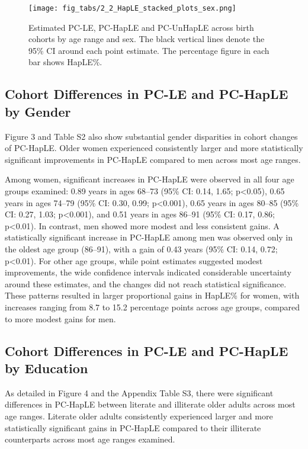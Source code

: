 \documentclass[12pt, a4paper]{article}
\begin{document}
\begin{figure}[!p]
  \centering
  \texttt{[image: fig\_tabs/2\_2\_HapLE\_stacked\_plots\_sex.png]}
  \caption{Estimated PC-LE, PC-HapLE and PC-UnHapLE across birth cohorts by age range and sex. The black vertical lines denote the 95\% CI around each point estimate. The percentage figure in each bar shows HapLE\%.}
\end{figure}

\subsection{Cohort Differences in PC-LE and PC-HapLE by Gender}

Figure 3 and Table S2 also show substantial gender disparities in cohort changes of PC-HapLE. Older women experienced consistently larger and more statistically significant improvements in PC-HapLE compared to men across most age ranges.

Among women, significant increases in PC-HapLE were observed in all four age groups examined: 0.89 years in ages 68–73 (95\% CI: 0.14, 1.65; p<0.05), 0.65 years in ages 74–79 (95\% CI: 0.30, 0.99; p<0.001), 0.65 years in ages 80–85 (95\% CI: 0.27, 1.03; p<0.001), and 0.51 years in ages 86–91 (95\% CI: 0.17, 0.86; p<0.01). In contrast, men showed more modest and less consistent gains. A statistically significant increase in PC-HapLE among men was observed only in the oldest age group (86–91), with a gain of 0.43 years (95\% CI: 0.14, 0.72; p<0.01). For other age groups, while point estimates suggested modest improvements, the wide confidence intervals indicated considerable uncertainty around these estimates, and the changes did not reach statistical significance. These patterns resulted in larger proportional gains in HapLE\% for women, with increases ranging from 8.7 to 15.2 percentage points across age groups, compared to more modest gains for men.

\subsection{Cohort Differences in PC-LE and PC-HapLE by Education}

As detailed in Figure 4 and the Appendix Table S3, there were significant differences in PC-HapLE between literate and illiterate older adults across most age ranges. Literate older adults consistently experienced larger and more statistically significant gains in PC-HapLE compared to their illiterate counterparts across most age ranges examined.
\end{document}
